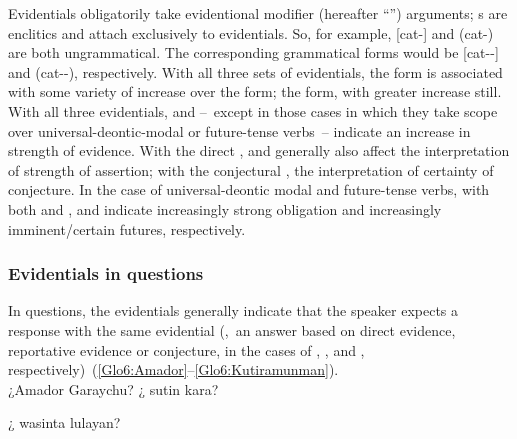 Evidentials obligatorily take evidentional modifier (hereafter “”) arguments; s are enclitics and attach exclusively to evidentials. So, for example,  [cat-] and  (cat-) are both ungrammatical. The corresponding grammatical forms would be  [cat--\uo] and  (cat--), respectively. With all three sets of evidentials, the  form is associated with some variety of increase over the \phono{-\uo} form; the  form, with greater increase still. With all three evidentials,  and  --~except in those cases in which they take scope over universal-deontic-modal or future-tense verbs~-- indicate an increase in strength of evidence. With the direct ,  and  generally also affect the interpretation of strength of assertion; with the conjectural , the interpretation of certainty of conjecture. In the case of universal-deontic modal and future-tense verbs, with both  and ,  and  indicate increasingly strong obligation and increasingly imminent/certain futures, respectively.

\subsubsection{Evidentials in questions}
In questions, the evidentials generally indicate that the speaker expects a response with the same evidential (\ie,~an answer based on direct evidence, reportative evidence or conjecture, in the cases of , , and , respectively)~(\ref{Glo6:Amador}--\ref{Glo6:Kutiramunman}).\\

%
{¿Amador Garaychu? ¿ sutin kara?}%
{}%
{}{}%

%
{¿ wasinta lulayan?}%
{}%
{}{}%

